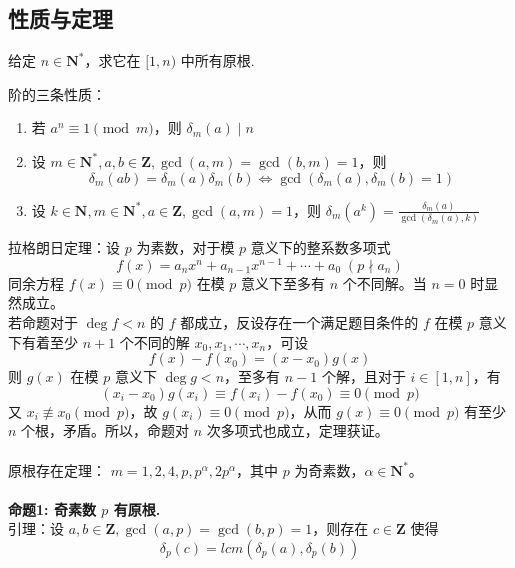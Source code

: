 \documentclass[12pt,a4paper]{article}
\begin{document}
\subsection{性质与定理}
\begin{mdframed}[leftline=true, linewidth=2pt, linecolor=gray]
	给定 $n\in\mathbf{N^*}$，求它在 $[1,n)$ 中所有原根.
\end{mdframed}
阶的三条性质：
\begin{enumerate}
	\item 若 $a^n\equiv 1\pmod m$，则 $\delta_m{(a)}\mid n$
	\item 设 $m\in \mathbf{N}^*,a,b\in\mathbf{Z},\gcd(a,m)=\gcd(b,m)=1$，则 \begin{equation*}
		\delta_m(ab)=\delta_m(a)\delta_m(b)\iff \gcd(\delta_m(a),\delta_m(b)=1)
	\end{equation*}
	\item 设 $k\in\mathbf{N},m\in\mathbf{N^*},a\in\mathbf{Z}, \gcd(a,m)=1$，则 $\displaystyle\delta_m(a^k)=\frac{\delta_m(a)}{\gcd(\delta_m(a),k)}$
\end{enumerate}
拉格朗日定理：设 $p$ 为素数，对于模 $p$ 意义下的整系数多项式 
\begin{equation*}
	f(x)=a_nx^n+a_{n-1}x^{n-1}+\cdots+a_0\;(p\nmid a_n)
\end{equation*}
同余方程 $f(x)\equiv 0\pmod p$ 在模 $p$ 意义下至多有 $n$ 个不同解。当 $n=0$ 时显然成立。\\若命题对于 $\deg f< n$ 的 $f$ 都成立，反设存在一个满足题目条件的 $f$ 在模 $p$ 意义下有着至少 $n+1$ 个不同的解 $x_0,x_1,\cdots,x_{n}$，可设
\begin{equation*}
	f(x)-f(x_0)=(x-x_0)g(x)
\end{equation*}
则 $g(x)$ 在模 $p$ 意义下 $\deg g<n$，至多有 $n-1$ 个解，且对于 $i\in[1,n]$，有 
\begin{equation*}
	(x_i-x_0)g(x_i)\equiv f(x_i)-f(x_0)\equiv0\pmod p
\end{equation*}
又 $x_i\not\equiv x_0\pmod p$，故 $g(x_i)\equiv0\pmod p$，从而 $g(x)\equiv0\pmod p$ 有至少 $n$ 个根，矛盾。所以，命题对 $n$ 次多项式也成立，定理获证。\\\\
原根存在定理： $m=1,2,4,p,p^\alpha,2p^\alpha$，其中 $p$ 为奇素数，$\alpha\in\mathbf{N^*}$。\\\\
\textbf{命题1: 奇素数 $p$ 有原根.}
\\引理：设 $a, b\in\mathbf{Z},\gcd(a,p)=\gcd(b,p)=1$，则存在 $c\in\mathbf{Z}$ 使得 \begin{equation*}
	\delta_p(c)=lcm(\delta_p(a),\delta_p(b))
\end{equation*}
\end{document}
